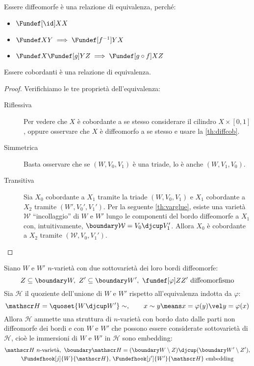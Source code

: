 \begin{oss}
	Essere diffeomorfe è una relazione di equivalenza, perché:
	\begin{itemize}
		\item $\Fundef[\id]XX$
		\item $\Fundef XY\implies\Fundef[f^{-1}]YX$
		\item $\Fundef X{\Fundef[g]YZ}\implies\Fundef[g\circ f]XZ$
	\end{itemize}
\end{oss}

\begin{lemma}
	Essere cobordanti è una relazione di equivalenza.
\end{lemma}

\begin{proof}
	Verifichiamo le tre proprietà dell'equivalenza:
	\begin{description}
		\item[Riflessiva]
			Per vedere che $X$ è cobordante a se stesso considerare il cilindro $X\times[0,1]$, oppure osservare che $X$ è diffeomorfo a se stesso e usare la \autoref{th:diffcob}.
		\item[Simmetrica]
			Basta osservare che se $(W,V_0,V_1)$ è una triade, lo è anche $(W,V_1,V_0)$.
		\item[Transitiva]
			Sia $X_0$ cobordante a $X_1$ tramite la triade $(W,V_0,V_1)$ e $X_1$ cobordante a $X_2$ tramite $(W',V_0',V_1')$.
			Per la seguente \autoref{th:varglue}, esiste una varietà $\mathcal W$ ``incollaggio'' di $W$ e $W'$ lungo le componenti del bordo diffeomorfe a $X_1$ con, intuitivamente, $\boundary\mathcal W=V_0\djcup V_1'$.
			Allora $X_0$ è cobordante a $X_2$ tramite $(\mathcal W,V_0,V_1')$.
			\qedhere
	\end{description}
\end{proof}

\begin{center}
	
\end{center}

\begin{prop}[Incollaggio]
	\label{th:varglue}
	Siano $W$ e $W'$ $n$-varietà con due sottovarietà dei loro bordi diffeomorfe:
	\[Z\subseteq\boundary W,\ Z'\subseteq\boundary W',\ \fundef[\varphi]Z{Z'}\text{ diffeomorfismo}\]
	Sia $\mathscr H$ il quoziente dell'unione di $W$ e $W'$ rispetto all'equivalenza indotta da $\varphi$:
	\[\mathscr H=\quoset{W\djcup W'}\sim,\qquad x\sim y\means x=\varphi(y)\vel y=\varphi(x)\]
	Allora $\mathscr H$ ammette una struttura di $n$-varietà con bordo dato dalle parti non diffeomorfe dei bordi e con $W$ e $W'$ che possono essere considerate sottovarietà di $\mathscr H$, cioè le immersioni di $W$ e $W'$ in $\mathscr H$ sono embedding:
	\begin{gather*}
		\mathscr H\text{ $n$-varietà},\ \boundary\mathscr H=(\boundary W\setminus Z)\djcup(\boundary W'\setminus Z'),\\
		\Fundefhook[j]{W}{\mathscr H},\,\Fundefhook[j']{W'}{\mathscr H}\text{ embedding}
	\end{gather*}
\end{prop}

